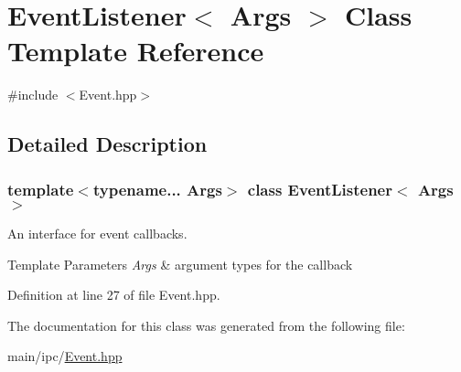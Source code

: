 \hypertarget{classEventListener}{}\section{Event\+Listener$<$ Args $>$ Class Template Reference}
\label{classEventListener}


{\ttfamily \#include $<$Event.\+hpp$>$}



\subsection{Detailed Description}
\subsubsection*{template$<$typename... Args$>$\newline
class Event\+Listener$<$ Args $>$}

An interface for event callbacks.


\begin{DoxyTemplParams}{Template Parameters}
{\em Args} & argument types for the callback \\
\hline
\end{DoxyTemplParams}


Definition at line 27 of file Event.\+hpp.



The documentation for this class was generated from the following file\+:\begin{DoxyCompactItemize}
\item 
main/ipc/\mbox{\hyperlink{Event_8hpp}{Event.\+hpp}}\end{DoxyCompactItemize}
